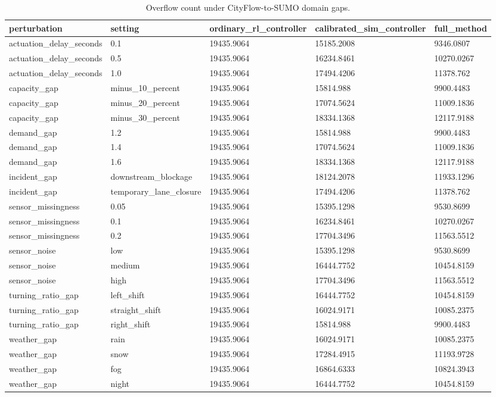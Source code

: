 \begin{table}[t]
\centering
\small
\begin{tabular}{lllll}
\toprule
perturbation & setting & ordinary\_rl\_controller & calibrated\_sim\_controller & full\_method \\
\midrule
actuation\_delay\_seconds & 0.1 & 19435.9064 & 15185.2008 & 9346.0807 \\
actuation\_delay\_seconds & 0.5 & 19435.9064 & 16234.8461 & 10270.0267 \\
actuation\_delay\_seconds & 1.0 & 19435.9064 & 17494.4206 & 11378.762 \\
capacity\_gap & minus\_10\_percent & 19435.9064 & 15814.988 & 9900.4483 \\
capacity\_gap & minus\_20\_percent & 19435.9064 & 17074.5624 & 11009.1836 \\
capacity\_gap & minus\_30\_percent & 19435.9064 & 18334.1368 & 12117.9188 \\
demand\_gap & 1.2 & 19435.9064 & 15814.988 & 9900.4483 \\
demand\_gap & 1.4 & 19435.9064 & 17074.5624 & 11009.1836 \\
demand\_gap & 1.6 & 19435.9064 & 18334.1368 & 12117.9188 \\
incident\_gap & downstream\_blockage & 19435.9064 & 18124.2078 & 11933.1296 \\
incident\_gap & temporary\_lane\_closure & 19435.9064 & 17494.4206 & 11378.762 \\
sensor\_missingness & 0.05 & 19435.9064 & 15395.1298 & 9530.8699 \\
sensor\_missingness & 0.1 & 19435.9064 & 16234.8461 & 10270.0267 \\
sensor\_missingness & 0.2 & 19435.9064 & 17704.3496 & 11563.5512 \\
sensor\_noise & low & 19435.9064 & 15395.1298 & 9530.8699 \\
sensor\_noise & medium & 19435.9064 & 16444.7752 & 10454.8159 \\
sensor\_noise & high & 19435.9064 & 17704.3496 & 11563.5512 \\
turning\_ratio\_gap & left\_shift & 19435.9064 & 16444.7752 & 10454.8159 \\
turning\_ratio\_gap & straight\_shift & 19435.9064 & 16024.9171 & 10085.2375 \\
turning\_ratio\_gap & right\_shift & 19435.9064 & 15814.988 & 9900.4483 \\
weather\_gap & rain & 19435.9064 & 16024.9171 & 10085.2375 \\
weather\_gap & snow & 19435.9064 & 17284.4915 & 11193.9728 \\
weather\_gap & fog & 19435.9064 & 16864.6333 & 10824.3943 \\
weather\_gap & night & 19435.9064 & 16444.7752 & 10454.8159 \\
\bottomrule
\end{tabular}
\caption{Overflow count under CityFlow-to-SUMO domain gaps.}
\label{tab:s2r-domain-gap}
\end{table}
